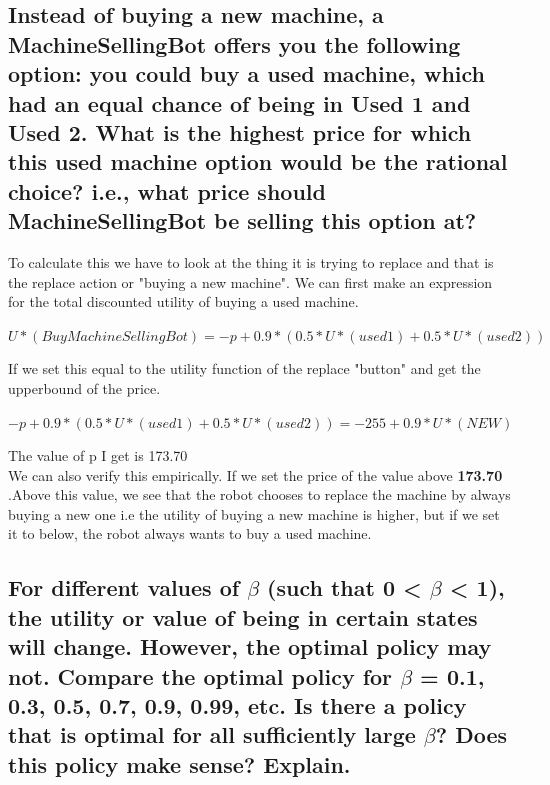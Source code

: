 \documentclass[11pt]{scrartcl} %
\begin{document}
\subsection{Instead of buying a new machine, a MachineSellingBot offers you the following option: you could buy a used
machine, which had an equal chance of being in Used 1 and Used 2.
What is the highest price for which this used machine option would be the rational choice? i.e., what price
should MachineSellingBot be selling this option at?}
To calculate this we have to look at the thing it is trying to replace and that is the replace action or "buying a new machine". We can first make an expression for the total discounted utility of buying a used machine. 
\begin{center}
$U*(BuyMachineSellingBot) = -p + 0.9*(0.5*U*(used1)+0.5*U*(used2))$
\end{center}
If we set this equal to the utility function of the replace "button" and get the upperbound of the price. 
\begin{center}
$-p + 0.9*(0.5*U*(used1)+0.5*U*(used2)) = -255 + 0.9*U*(NEW)$
\end{center}
The value of p I get is 173.70\\
We can also verify this empirically. If we set the price of the value above \textbf{173.70} .Above this value, we see that the robot chooses to replace the machine by always buying a new one i.e the utility of buying a new machine is higher, but if we set it to below, the robot always wants to buy a used machine. 

\subsection{For different values of $\beta$ (such that 0 < $\beta$ < 1), the utility or value of being in certain states will change.
However, the optimal policy may not. Compare the optimal policy for $\beta$ = 0.1, 0.3, 0.5, 0.7, 0.9, 0.99, etc. Is there a policy that is optimal for all sufficiently large $\beta$? Does this policy make sense? Explain.}
\end{document}
